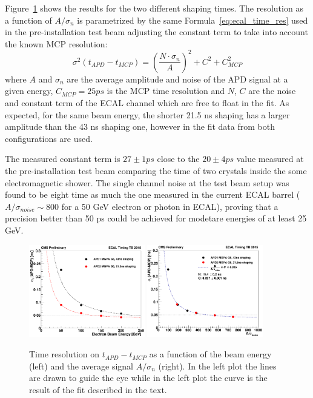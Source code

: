 Figure~\ref{fig:results_treso} shows the results for the two different shaping times.
The resolution as a function of $A/\sigma_{n}$ is parametrized by the same Formula~\ref{eq:ecal_time_res} used in the
pre-installation test beam adjusting the constant term to take into account the known MCP resolution:
\[
  \sigma^2(t_{APD} - t_{MCP}) = \left( \frac{N\cdot\sigma_n}{A} \right)^2 + C^2 + C_{MCP}^2
\]
where $A$ and $\sigma_n$ are the average amplitude and noise of the APD signal at a given energy, $C_{MCP} = 25 ps$ is
the MCP time resolution and $N$, $C$ are the noise and constant term of the ECAL channel which are free to float in the fit.
As expected, for the same beam energy, the shorter 21.5 ns shaping has a larger amplitude than the 43 ns shaping one,
however in the fit data from both configurations are used.

The measured constant term is $27 \pm 1 ps$ close to the $20 \pm 4 ps$ value measured at the pre-installation test beam comparing the
time of two crystals inside the some electromagnetic shower.
The single channel noise at the test beam setup was found to be eight time as much the one measured in the current ECAL barrel
($A/\sigma_{noise} \sim 800$ for a 50 GeV electron or photon in ECAL), proving that a precision better than 50 ps could
be achieved for modetare energies of at least 25 GeV.

\begin{figure}[h!]
  \centering
  \includegraphics[width = 0.45\textwidth]{figures/upgrade/APD_t_res_vs_energy.png}
  \includegraphics[width = 0.45\textwidth]{figures/upgrade/APD_t_res_vs_AoverN.png}
  \caption{Time resolution on $t_{APD}-t_{MCP}$ as a function of the beam energy (left)
    and the average signal $A/\sigma_n$ (right).
    In the left plot the lines are drawn to guide the eye while in the left plot the curve is the result of the
    fit described in the text.}
  \label{fig:results_treso}
\end{figure}

